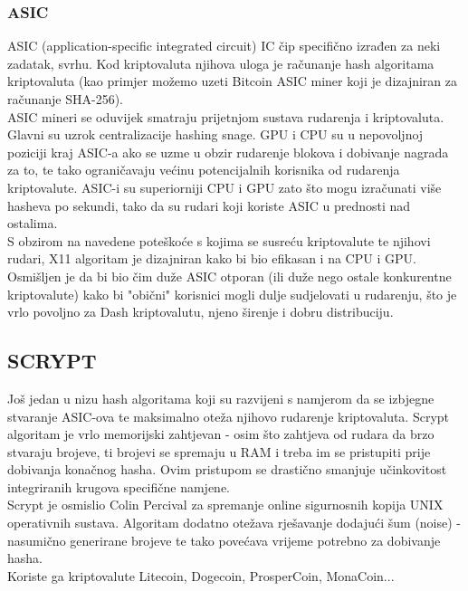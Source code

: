 \documentclass[12pt]{article}
\begin{document}
\subsubsection{ASIC}
ASIC (application-specific integrated circuit) IC čip specifično izrađen za neki zadatak, svrhu. Kod kriptovaluta njihova uloga je računanje hash algoritama kriptovaluta (kao primjer možemo uzeti Bitcoin ASIC miner koji je dizajniran za računanje SHA-256). \\
ASIC mineri se oduvijek smatraju prijetnjom sustava rudarenja i kriptovaluta. Glavni su uzrok centralizacije hashing snage. GPU i CPU su u nepovoljnoj poziciji kraj ASIC-a ako se uzme u obzir rudarenje blokova i dobivanje nagrada za to, te tako ograničavaju većinu potencijalnih korisnika od rudarenja kriptovalute. 
ASIC-i su superiorniji CPU i GPU zato što mogu izračunati više hasheva po sekundi, tako da su rudari koji koriste ASIC u prednosti nad ostalima.\cite{asic}\\
S obzirom na navedene poteškoće s kojima se susreću kriptovalute te njihovi rudari, X11 algoritam je dizajniran kako bi bio efikasan i na CPU i GPU. Osmišljen je da bi bio čim duže ASIC otporan (ili duže nego ostale konkurentne kriptovalute) kako bi "obični" korisnici mogli dulje sudjelovati u rudarenju, što je vrlo povoljno za Dash kriptovalutu, njeno širenje i dobru distribuciju. \\  



\subsection{SCRYPT}
Još jedan u nizu hash algoritama koji su razvijeni s namjerom  da se izbjegne stvaranje ASIC-ova te maksimalno oteža njihovo rudarenje kriptovaluta. Scrypt algoritam je vrlo memorijski zahtjevan - osim što zahtjeva od rudara da brzo stvaraju brojeve, ti brojevi se spremaju u RAM i treba im se pristupiti prije dobivanja konačnog hasha. Ovim pristupom se drastično smanjuje učinkovitost integriranih krugova specifične namjene.\\
Scrypt je osmislio Colin Percival za spremanje online sigurnosnih kopija UNIX operativnih sustava. Algoritam dodatno otežava rješavanje dodajući šum (noise) - nasumično generirane brojeve te tako povećava vrijeme potrebno za dobivanje hasha. \\
Koriste ga kriptovalute Litecoin, Dogecoin, ProsperCoin, MonaCoin...\\
\end{document}

